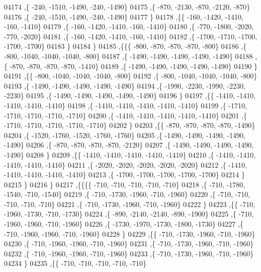 \begin{DoxyCode}
04174     ,\{  -240, -1510, -1490,  -240, -1490\}
04175     ,\{  -870, -2130,  -870, -2120,  -870\}
04176     ,\{  -240, -1510, -1490,  -240, -1490\}
04177     \}
04178    ,\{\{  -160, -1420, -1410,  -160, -1410\}
04179     ,\{  -160, -1420, -1410,  -160, -1410\}
04180     ,\{  -770, -1800, -2020,  -770, -2020\}
04181     ,\{  -160, -1420, -1410,  -160, -1410\}
04182     ,\{ -1700, -1710, -1700, -1700, -1700\}
04183     \}
04184    \}
04185   ,\{\{\{  -800,  -870,  -870,  -870,  -800\}
04186     ,\{  -800, -1040, -1040, -1040,  -800\}
04187     ,\{ -1490, -1490, -1490, -1490, -1490\}
04188     ,\{  -870,  -870,  -870,  -870, -1410\}
04189     ,\{ -1490, -1490, -1490, -1490, -1490\}
04190     \}
04191    ,\{\{  -800, -1040, -1040, -1040,  -800\}
04192     ,\{  -800, -1040, -1040, -1040,  -800\}
04193     ,\{ -1490, -1490, -1490, -1490, -1490\}
04194     ,\{ -1990, -2230, -1990, -2230, -2230\}
04195     ,\{ -1490, -1490, -1490, -1490, -1490\}
04196     \}
04197    ,\{\{ -1410, -1410, -1410, -1410, -1410\}
04198     ,\{ -1410, -1410, -1410, -1410, -1410\}
04199     ,\{ -1710, -1710, -1710, -1710, -1710\}
04200     ,\{ -1410, -1410, -1410, -1410, -1410\}
04201     ,\{ -1710, -1710, -1710, -1710, -1710\}
04202     \}
04203    ,\{\{  -870,  -870,  -870,  -870, -1490\}
04204     ,\{ -1520, -1760, -1520, -1760, -1760\}
04205     ,\{ -1490, -1490, -1490, -1490, -1490\}
04206     ,\{  -870,  -870,  -870,  -870, -2120\}
04207     ,\{ -1490, -1490, -1490, -1490, -1490\}
04208     \}
04209    ,\{\{ -1410, -1410, -1410, -1410, -1410\}
04210     ,\{ -1410, -1410, -1410, -1410, -1410\}
04211     ,\{ -2020, -2020, -2020, -2020, -2020\}
04212     ,\{ -1410, -1410, -1410, -1410, -1410\}
04213     ,\{ -1700, -1700, -1700, -1700, -1700\}
04214     \}
04215    \}
04216   \}
04217  ,\{\{\{\{  -710,  -710,  -710,  -710,  -710\}
04218     ,\{  -710, -1780, -1540,  -710, -1540\}
04219     ,\{  -710, -1730, -1960,  -710, -1960\}
04220     ,\{  -710,  -710,  -710,  -710,  -710\}
04221     ,\{  -710, -1730, -1960,  -710, -1960\}
04222     \}
04223    ,\{\{  -710, -1960, -1730,  -710, -1730\}
04224     ,\{  -890, -2140, -2140,  -890, -1900\}
04225     ,\{  -710, -1960, -1960,  -710, -1960\}
04226     ,\{ -1730, -1970, -1730, -1800, -1730\}
04227     ,\{  -710, -1960, -1960,  -710, -1960\}
04228     \}
04229    ,\{\{  -710, -1730, -1960,  -710, -1960\}
04230     ,\{  -710, -1960, -1960,  -710, -1960\}
04231     ,\{  -710, -1730, -1960,  -710, -1960\}
04232     ,\{  -710, -1960, -1960,  -710, -1960\}
04233     ,\{  -710, -1730, -1960,  -710, -1960\}
04234     \}
04235    ,\{\{  -710,  -710,  -710,  -710,  -710\}

\end{DoxyCode}
